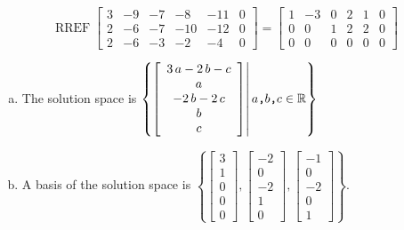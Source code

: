 \begin{exerciseAnswer} 


\[\operatorname{RREF} \left[\begin{array}{ccccc|c}
3 & -9 & -7 & -8 & -11 & 0 \\
2 & -6 & -7 & -10 & -12 & 0 \\
2 & -6 & -3 & -2 & -4 & 0
\end{array}\right] = \left[\begin{array}{ccccc|c}
1 & -3 & 0 & 2 & 1 & 0 \\
0 & 0 & 1 & 2 & 2 & 0 \\
0 & 0 & 0 & 0 & 0 & 0
\end{array}\right] \]


\begin{enumerate}[(a)]
\item The solution space is \( \left\{ \left[\begin{array}{c}
3 \, a - 2 \, b - c \\
a \\
-2 \, b - 2 \, c \\
b \\
c
\end{array}\right] \middle|\,a\text{\texttt{,}}b\text{\texttt{,}}c\in\mathbb{R}\right\} \)
\item A basis of the solution space is \( \left\{ \left[\begin{array}{c}
3 \\
1 \\
0 \\
0 \\
0
\end{array}\right] , \left[\begin{array}{c}
-2 \\
0 \\
-2 \\
1 \\
0
\end{array}\right] , \left[\begin{array}{c}
-1 \\
0 \\
-2 \\
0 \\
1
\end{array}\right] \right\} \).
\end{enumerate}
    
\end{exerciseAnswer}
    
